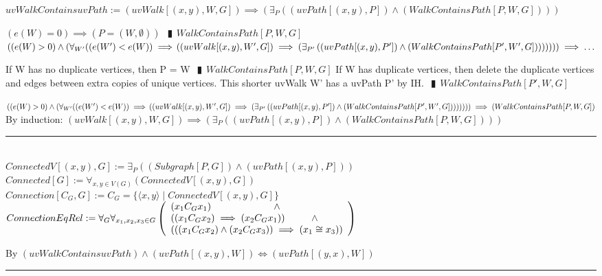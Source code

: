 \documentclass{book}
\newcommand{\abr}{:=}
\newcommand{\pipe}{$\phantom{(}\vrectangleblack\phantom{)}$}
\newcommand{\pr}[1]{\left(#1\right)}
\newcommand{\st}{\mathbin{|}}
\begin{document}
$uvWalkContainsuvPath \abr \pr{uvWalk[(x, y), W, G]} \implies \pr{\exists_{P}\pr{\pr{uvPath[(x, y), P]} \land (WalkContainsPath[P, W, G])}}$
\begin{enumerate}
  \lit $\pr{e(W) = 0} \implies \pr{P = (W, \emptyset)}$ \pipe $WalkContainsPath[P, W, G]$
  \lit $\pr{(e(W) > 0} \land \pr{\forall_{W'}((e(W') < e(W)} \implies \\
        \pr{\pr{uvWalk[(x, y), W', G]} \implies \pr{\exists_{P'}\pr{\pr{uvPath[(x, y), P']} \land (WalkContainsPath[P', W', G])}}}))) \implies \ldots$
  \begin{enumerate}
    \lit If W has no duplicate vertices, then P = W \pipe $WalkContainsPath[P, W, G]$
    \lit If W has duplicate vertices, then delete the duplicate vertices and edges between extra copies of unique vertices. This shorter uvWalk W' has a uvPath P' by IH. \pipe $WalkContainsPath[P', W, G]$
  \end{enumerate}
  \lit $\pr{(e(W) > 0} \land \pr{\forall_{W'}((e(W') < e(W)} \implies \\
  \pr{\pr{uvWalk[(x, y), W', G]} \implies \pr{\exists_{P'}\pr{\pr{uvPath[(x, y), P']} \land (WalkContainsPath[P', W', G])}}}))) \implies (WalkContainsPath[P, W, G])$
  \lit By induction: $\pr{uvWalk[(x, y), W, G]} \implies \pr{\exists_{P}\pr{\pr{uvPath[(x, y), P]} \land (WalkContainsPath[P, W, G])}}$
\end{enumerate} \vspace{.75mm} \hrule \vspace{.75mm} \ \\

$ConnectedV[(x, y), G] \abr \exists_{P}\pr{(Subgraph[P, G]) \land \pr{uvPath[(x, y), P]}}$ \\
$Connected[G] \abr \forall_{x, y \in V(G)}\pr{ConnectedV[(x, y), G]}$ \\
$Connection[C_G, G] \abr C_G = \{\langle x, y \rangle \st ConnectedV[(x, y), G]\}$ \\

$ConnectionEqRel \abr \forall_{G} \forall_{x_1, x_2, x_3 \in G}
\left(\begin{array}{ll}
  (x_1 C_G x_1) \hfill \land \hfill \\
  \pr{(x_1 C_G x_2) \implies (x_2 C_G x_1)} \hfill \land \hfill \\
  \pr{\pr{(x_1 C_G x_2) \land (x_2 C_G x_3)} \implies (x_1 \cong x_3)} \\
\end{array}\right)$
\begin{enumerate}
  \lit By $(uvWalkContainsuvPath) \land \pr{uvPath[(x, y), W]} \iff \pr{uvPath[(y, x), W]}$
\end{enumerate} \vspace{.75mm} \hrule \vspace{.75mm} \ \\
\end{document}
